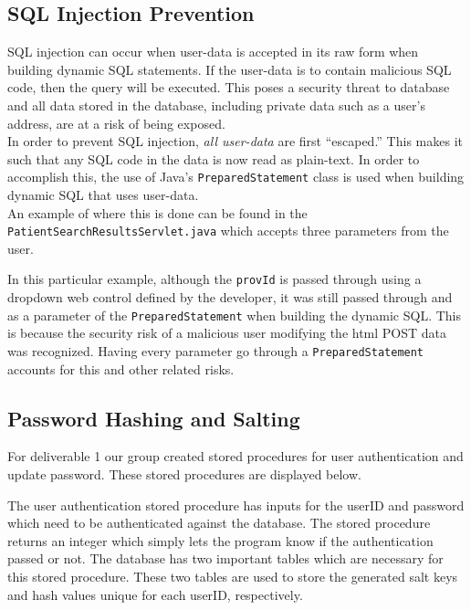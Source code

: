 \documentclass{article}
\begin{document}
\subsection{SQL Injection Prevention}
SQL injection can occur when user-data is accepted in its raw form when building dynamic SQL statements. If the user-data is to contain malicious SQL code, then the query will be executed. This poses a security threat to database and all data stored in the database, including private data such as a user's address, are at a risk of being exposed. \\

In order to prevent SQL injection, \textit{all user-data} are first ``escaped.'' This makes it such that any SQL code in the data is now read as plain-text. In order to accomplish this, the use of Java's \texttt{PreparedStatement} class is used when building dynamic SQL that uses user-data. \\

An example of where this is done can be found in the \texttt{PatientSearchResultsServlet.java} which accepts three parameters from the user.



In this particular example, although the \texttt{provId} is passed through using a dropdown web control defined by the developer, it was still passed through and as a parameter of the \texttt{PreparedStatement} when building the dynamic SQL. This is because the security risk of a malicious user modifying the html POST data was recognized. Having every parameter go through a \texttt{PreparedStatement} accounts for this and other related risks.

\subsection{Password Hashing and Salting}
For deliverable 1 our group created stored procedures for user authentication and update password. These stored procedures are displayed below.



The user authentication stored procedure has inputs for the userID and password which need to be authenticated against the database. The stored procedure returns an integer which simply lets the program know if the authentication passed or not. The database has two important tables which are necessary for this stored procedure. These two tables are used to store the generated salt keys and hash values unique for each userID, respectively. \\
\end{document}
